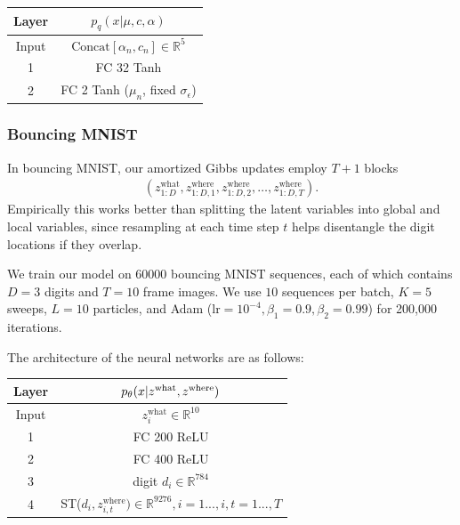 \documentclass[anonymous=false, %
               format=acmsmall, %
               review=true, %
               screen=true, %
               nonacm=true]{acmart}
\theoremstyle{definition}
\begin{document}
\begin{table}[h]
    \centering
    \begin{tabular}{c|c}
    \toprule
    \textbf{Layer}
    &
    $p_q(x | \mu, c, \alpha)$ \\
    \midrule
    Input
    &
    $\mathrm{Concat}[\alpha_n, c_n]\in\mathbb{R}^5$ 
    \\
    \hline
    1
    &
    FC 32 Tanh \\
    \hline
    2
    &
    FC 2 Tanh ($\mu_n$, fixed $\sigma_\epsilon$)\\
    \bottomrule
    \end{tabular}
    \label{arch-dgmm-decoder}
\end{table}
\newpage
\subsubsection*{Bouncing MNIST}
\label{appendix:arch-bmnist}

In bouncing MNIST, our amortized Gibbs updates employ $T + 1$ blocks
\begin{align*}
    (z_{1:D}^{\mathrm{what}}, z_{1:D, 1}^{\mathrm{where}}, z_{1:D, 2}^{\mathrm{where}}, \dotsc, z_{1:D, T}^{\mathrm{where}}).
\end{align*} 
Empirically this works better than splitting the latent variables into global and local variables, since resampling at each time step $t$ helps disentangle the digit locations if they overlap.

We train our model on 60000 bouncing MNIST sequences, each of which contains $D=3$ digits and $T=10$ frame images. We use $10$ sequences per batch, $K=5$ sweeps, $L=10$ particles, and Adam ($\mathrm{lr} = 10^{-4}, \beta_1 = 0.9, \beta_2 = 0.99$) for 200,000 iterations.

The architecture of the neural networks are as follows:
\begin{table}[h]
\centering
\label{arch-bmnist-decoder}
\begin{tabular}{c|c}
    \toprule
    \textbf{Layer} & $p_\theta(x | z^{\mathrm{what}}, z^{\mathrm{where}})$ \\
    \midrule
    Input & $z^{\mathrm{what}}_i \in\mathbb{R}^{10}$
    \\
    \hline
    1 &
    FC 200 ReLU \\
    \hline
    2 &
    FC 400 ReLU \\
    \hline
    3 & digit $d_i\in\mathbb{R}^{784}$\\
    \hline
    4 & ST($d_{i}, z^{\mathrm{where}}_{i, t}) \in\mathbb{R}^{9276}, i=1...,i, t=1...,T$ \\
    \bottomrule
\end{tabular}
\end{table}
\end{document}
